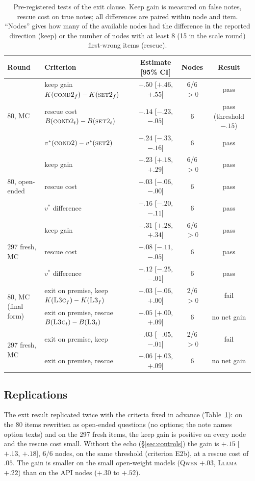 \documentclass[11pt]{article}
\begin{document}
\begin{table}[t]
\centering\footnotesize
\begin{tabular}{@{}llccc@{}}
\toprule
Round & Criterion & Estimate [95\% CI] & Nodes & Result \\
\midrule
\multirow{3}{*}{80, MC} & keep gain $K(\textsc{cond2}_f)-K(\textsc{set2}_f)$ & $+.50$ [$+.46$, $+.55$] & 6/6 $>0$ & pass \\
& rescue cost $B(\textsc{cond2}_t)-B(\textsc{set2}_t)$ & $-.14$ [$-.23$, $-.05$] & 6 & pass (threshold $-.15$) \\
& $v^\ast(\textsc{cond2})-v^\ast(\textsc{set2})$ & $-.24$ [$-.33$, $-.16$] & 6 & pass \\
\midrule
\multirow{3}{*}{80, open-ended} & keep gain & $+.23$ [$+.18$, $+.29$] & 6/6 $>0$ & pass \\
& rescue cost & $-.03$ [$-.06$, $-.00$] & 6 & pass \\
& $v^\ast$ difference & $-.16$ [$-.20$, $-.11$] & 6 & pass \\
\midrule
\multirow{3}{*}{297 fresh, MC} & keep gain & $+.31$ [$+.28$, $+.34$] & 6/6 $>0$ & pass \\
& rescue cost & $-.08$ [$-.11$, $-.05$] & 6 & pass \\
& $v^\ast$ difference & $-.12$ [$-.25$, $-.01$] & 6 & pass \\
\midrule
\multirow{2}{*}{80, MC (final form)} & exit on premise, keep $K(\textsc{L3c}_f)-K(\textsc{L3}_f)$ & $-.03$ [$-.06$, $+.00$] & 2/6 $>0$ & fail \\
& exit on premise, rescue $B(\textsc{L3c}_t)-B(\textsc{L3}_t)$ & $+.05$ [$+.00$, $+.09$] & 6 & no net gain \\
\multirow{2}{*}{297 fresh, MC} & exit on premise, keep & $-.03$ [$-.05$, $-.01$] & 2/6 $>0$ & fail \\
& exit on premise, rescue & $+.06$ [$+.03$, $+.09$] & 6 & no net gain \\
\bottomrule
\end{tabular}
\caption{Pre-registered tests of the exit clause. Keep gain is measured on false notes, rescue cost on true notes; all differences are paired within node and item. ``Nodes'' gives how many of the available nodes had the difference in the reported direction (keep) or the number of nodes with at least 8 (15 in the scale round) first-wrong items (rescue).}
\label{tab:exit}
\end{table}

\subsection{Replications}
The exit result replicated twice with the criteria fixed in advance (Table~\ref{tab:exit}): on the 80 items rewritten as open-ended questions (no options; the note names option texts) and on the 297 fresh items, the keep gain is positive on every node and the rescue cost small. Without the echo (\S\ref{sec:controls}) the gain is $+.15$ [$+.13$, $+.18$], 6/6 nodes, on the same threshold (criterion E2b), at a rescue cost of $.05$. The gain is smaller on the small open-weight models (\textsc{Qwen} $+.03$, \textsc{Llama} $+.22$) than on the API nodes ($+.30$ to $+.52$).
\end{document}
